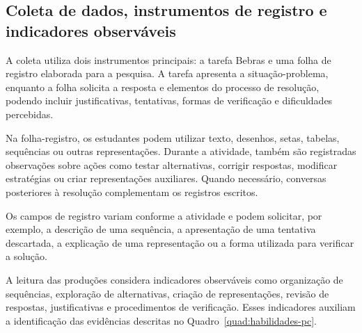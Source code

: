 
\subsection{Coleta de dados, instrumentos de registro e indicadores observáveis}

A coleta utiliza dois instrumentos principais: a tarefa Bebras e uma folha de registro elaborada para a pesquisa. A tarefa apresenta a situação-problema, enquanto  a folha solicita a resposta e elementos do processo de resolução, podendo incluir justificativas, tentativas, formas de verificação e dificuldades percebidas. 

Na folha-registro, os estudantes podem utilizar texto, desenhos, setas, tabelas, sequências ou outras representações. Durante a atividade, também são registradas observações sobre ações como testar alternativas, corrigir respostas, modificar estratégias ou criar representações auxiliares. Quando necessário, conversas posteriores à resolução complementam os registros escritos.

Os campos de registro variam conforme a atividade e podem solicitar, por exemplo, a descrição de uma sequência, a apresentação de uma tentativa descartada, a explicação de uma representação ou a forma utilizada para verificar a solução.

A leitura das produções considera indicadores observáveis como organização de sequências, exploração de alternativas, criação de representações, revisão de respostas, justificativas e procedimentos de verificação. Esses indicadores auxiliam a identificação das evidências descritas no Quadro~\ref{quad:habilidades-pc}.

